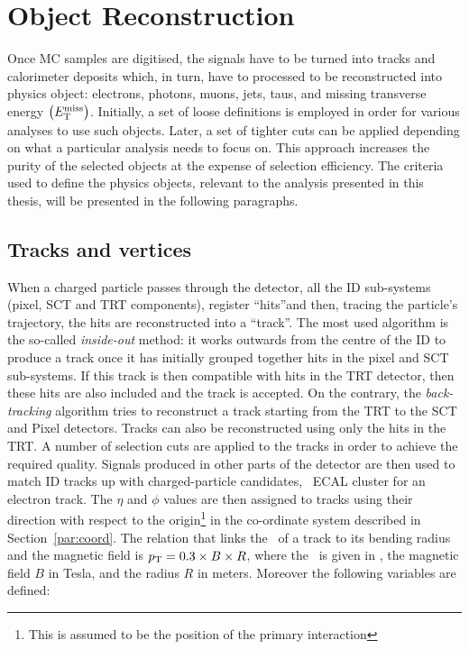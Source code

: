 	\section{Object Reconstruction}
	\label{sec:objReco}

		Once \ac{MC} samples are digitised, the signals have to be turned into tracks and calorimeter deposits which, in turn, have to processed to be reconstructed into physics object: electrons, photons, muons, jets, taus, and missing transverse energy $\left ( E_{\mathrm{T}}^{\mathrm{miss}} \right )$. Initially, a set of loose definitions is employed in order for various analyses to use such objects. Later, a set of tighter cuts can be applied depending on what a particular analysis needs to focus on. This approach increases the purity of the selected objects at the expense of selection efficiency. The criteria used to define the physics objects, relevant to the analysis presented in this thesis, will be presented in the following paragraphs.


		\subsection*{Tracks and vertices}

			When a charged particle passes through the detector, all the \ac{ID} sub-systems (pixel, \ac{SCT} and \ac{TRT} components), register ``hits''and then, tracing the particle's trajectory, the hits are reconstructed into a ``track''. The most used algorithm is the so-called \emph{inside-out} method: it works outwards from the centre of the \ac{ID} to produce a track once it has initially grouped together hits in the pixel and \ac{SCT} sub-systems. If this track is then compatible with hits in the \ac{TRT} detector, then these hits are also included and the track is accepted. On the contrary, the \emph{back-tracking} algorithm tries to reconstruct a track starting from the \ac{TRT} to the \ac{SCT} and Pixel detectors. Tracks can also be reconstructed using only the hits in the \ac{TRT}. A number of selection cuts are applied to the tracks in order to achieve the required quality. Signals produced in other parts of the detector are then used to match \ac{ID} tracks up with charged-particle candidates, \eg\ \ac{ECAL} cluster for an electron track. The $\eta$ and $\phi$ values are then assigned to tracks using their direction with respect to the origin\footnote{This is assumed to be the position of the primary interaction} in the co-ordinate system described in Section~\ref{par:coord}. The relation that links the \pt\ of a track to its bending radius and the magnetic field is $p_{\mathrm{T}} = 0.3 \times B \times R$, where the \pt\ is given in \GeV, the magnetic field $B$ in Tesla, and the radius $R$ in meters. Moreover the following variables are defined:


